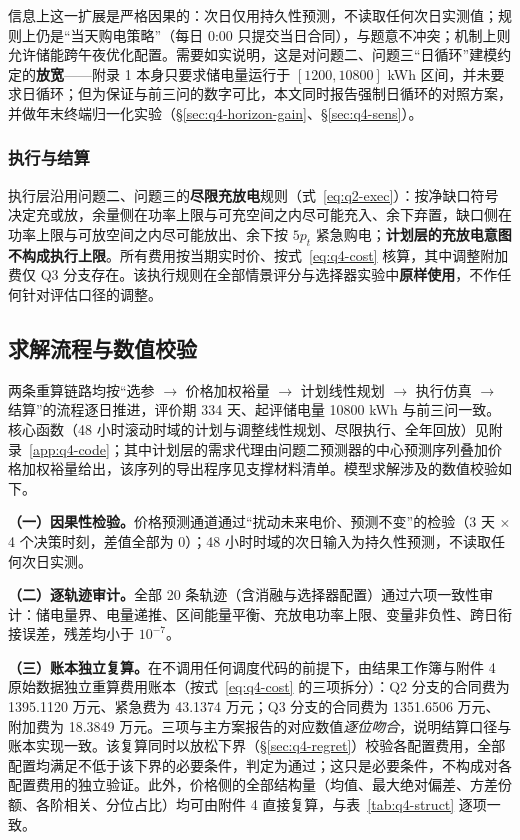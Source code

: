 信息上这一扩展是严格因果的：次日仅用持久性预测，不读取任何次日实测值；规则上仍是``当天购电策略''（每日 0:00 只提交当日合同），与题意不冲突；机制上则允许储能跨午夜优化配置。需要如实说明，这是对问题二、问题三``日循环''建模约定的\textbf{放宽}——附录 1 本身只要求储电量运行于 $[1200,10800]$ kWh 区间，并未要求日循环；但为保证与前三问的数字可比，本文同时报告强制日循环的对照方案，并做年末终端归一化实验（\S\ref{sec:q4-horizon-gain}、\S\ref{sec:q4-sens}）。

\subsubsection{执行与结算}

执行层沿用问题二、问题三的\textbf{尽限充放电}规则（式~\eqref{eq:q2-exec}）：按净缺口符号决定充或放，余量侧在功率上限与可充空间之内尽可能充入、余下弃置，缺口侧在功率上限与可放空间之内尽可能放出、余下按 $5p_t$ 紧急购电；\textbf{计划层的充放电意图不构成执行上限}。所有费用按当期实时价、按式~\eqref{eq:q4-cost} 核算，其中调整附加费仅 Q3 分支存在。该执行规则在全部情景评分与选择器实验中\textbf{原样使用}，不作任何针对评估口径的调整。

\subsection{求解流程与数值校验}
\label{sec:q4-check}

两条重算链路均按``选参 $\to$ 价格加权裕量 $\to$ 计划线性规划 $\to$ 执行仿真 $\to$ 结算''的流程逐日推进，评价期 334 天、起评储电量 10800 kWh 与前三问一致。核心函数（48 小时滚动时域的计划与调整线性规划、尽限执行、全年回放）见附录~\ref{app:q4-code}；其中计划层的需求代理由问题二预测器的中心预测序列叠加价格加权裕量给出，该序列的导出程序见支撑材料清单。模型求解涉及的数值校验如下。

\textbf{（一）因果性检验。}价格预测通道通过``扰动未来电价、预测不变''的检验（3 天 $\times$ 4 个决策时刻，差值全部为 0）；48 小时时域的次日输入为持久性预测，不读取任何次日实测。

\textbf{（二）逐轨迹审计。}全部 20 条轨迹（含消融与选择器配置）通过六项一致性审计：储电量界、电量递推、区间能量平衡、充放电功率上限、变量非负性、跨日衔接误差，残差均小于 $10^{-7}$。

\textbf{（三）账本独立复算。}在不调用任何调度代码的前提下，由结果工作簿与附件 4 原始数据独立重算费用账本（按式~\eqref{eq:q4-cost} 的三项拆分）：Q2 分支的合同费为 1395.1120 万元、紧急费为 43.1374 万元；Q3 分支的合同费为 1351.6506 万元、附加费为 18.3849 万元。三项与主方案报告的对应数值\emph{逐位吻合}，说明结算口径与账本实现一致。该复算同时以放松下界（\S\ref{sec:q4-regret}）校验各配置费用，全部配置均满足不低于该下界的必要条件，判定为通过；这只是必要条件，不构成对各配置费用的独立验证。此外，价格侧的全部结构量（均值、最大绝对偏差、方差份额、各阶相关、分位占比）均可由附件 4 直接复算，与表~\ref{tab:q4-struct} 逐项一致。

